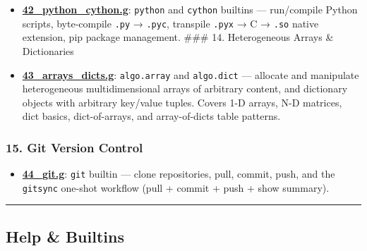 \documentclass[
]{article}
\providecommand{\tightlist}{%
  \setlength{\itemsep}{0pt}\setlength{\parskip}{0pt}}
\begin{document}
\begin{itemize}
\tightlist
\item
  \textbf{\url{42_python_cython.g}}: \texttt{python} and \texttt{cython}
  builtins --- run/compile Python scripts, byte-compile \texttt{.py} →
  \texttt{.pyc}, transpile \texttt{.pyx} → C → \texttt{.so} native
  extension, pip package management. \#\#\# 14. Heterogeneous Arrays \&
  Dictionaries
\item
  \textbf{\url{43_arrays_dicts.g}}: \texttt{algo.array} and
  \texttt{algo.dict} --- allocate and manipulate heterogeneous
  multidimensional arrays of arbitrary content, and dictionary objects
  with arbitrary key/value tuples. Covers 1-D arrays, N-D matrices, dict
  basics, dict-of-arrays, and array-of-dicts table patterns.
\end{itemize}

\subsubsection{15. Git Version Control}\label{git-version-control}

\begin{itemize}
\tightlist
\item
  \textbf{\url{44_git.g}}: \texttt{git} builtin --- clone repositories,
  pull, commit, push, and the \texttt{gitsync} one-shot workflow (pull +
  commit + push + show summary).
\end{itemize}

\begin{center}\rule{0.5\linewidth}{0.5pt}\end{center}

\subsection{Help \& Builtins}\label{help-builtins}
\end{document}
